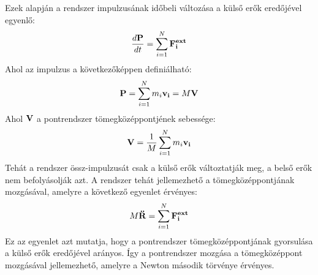 \documentclass[../main.tex]{subfiles}
\begin{document}
Ezek alapján a rendszer impulzusának időbeli változása a külső erők eredőjével egyenlő:
\begin{equation}
    \frac{d\bold{P}}{dt} = \sum_{i=1}^{N} \bold{F_i^{ext}}
\end{equation}
Ahol az impulzus a következőképpen definiálható:
\begin{equation}
    \bold{P} = \sum_{i=1}^{N} m_i \bold{v_i} = M \bold{V}
\end{equation}
Ahol $\bold{V}$ a pontrendszer tömegközéppontjének sebessége:
\begin{equation}
    \bold{V} = \frac{1}{M} \sum_{i=1}^{N} m_i \bold{v_i}
\end{equation}
Tehát a rendszer össz-impulzusát csak a külső erők változtatják meg, a belső erők nem befolyásolják azt. A rendszer tehát jellemezhető a tömegközéppontjának mozgásával, amelyre a következő egyenlet érvényes:
\begin{equation}
    M \bold{\ddot{R}} = \sum_{i=1}^{N} \bold{F_i^{ext}}
\end{equation}
Ez az egyenlet azt mutatja, hogy a pontrendszer tömegközéppontjának gyorsulása a külső erők eredőjével arányos. Így a pontrendszer mozgása a tömegközéppont mozgásával jellemezhető, amelyre a Newton második törvénye érvényes.
\end{document}
